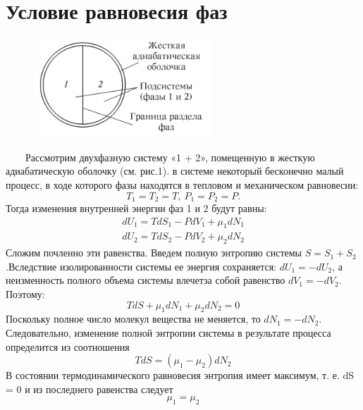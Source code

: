 \documentclass[a4, 12pt]{article}
\begin{document}
\section{Условие равновесия фаз}
\begin{figure}
           \includegraphics[width=1\linewidth]{vpv1.png} 
           \caption{}
           \label{ris:image}
\end{figure}
\ \ \ \ Рассмотрим двухфазную систему «1 + 2», помещенную в жесткую адиабатическую оболочку (см. рис.1).
 в системе некоторый
бесконечно малый процесс, в ходе
которого фазы находятся в тепловом
и механическом равновесии:
\begin{equation}
    T_1 = T_2 = T, \ P_1 = P_2 = P.
\end{equation}
Тогда изменения внутренней энергии фаз 1 и 2 будут равны:
\begin{eqnarray}
    dU_1 = TdS_1 - PdV_1 + μ_1dN_1\\
    dU_2 = TdS_2 - PdV_2 + μ_2dN_2
\end{eqnarray}
Сложим почленно эти равенства. Введем полную энтропию системы $S = S_1 + S_2$.Вследствие изолированности системы ее энергия сохраняется: $dU_1 = −dU_2$, а неизменность полного объема системы влечетза собой равенство $dV_1 = −dV_2$. Поэтому:
\begin{equation}
    TdS + \mu_1dN_1 + \mu_2dN_2 = 0
\end{equation}
Поскольку полное число молекул вещества не меняется, то $dN_1 = −dN_2$. Следовательно, изменение полной энтропии системы в результате процесса определится из соотношения
\begin{equation}
    TdS = (\mu_1 - \mu_2)dN_2
\end{equation}
В состоянии термодинамического равновесия энтропия имеет максимум, т. е. dS = 0 и из последнего равенства следует
\begin{equation}
    \mu_1 = \mu_2
\end{equation}
\end{document}
